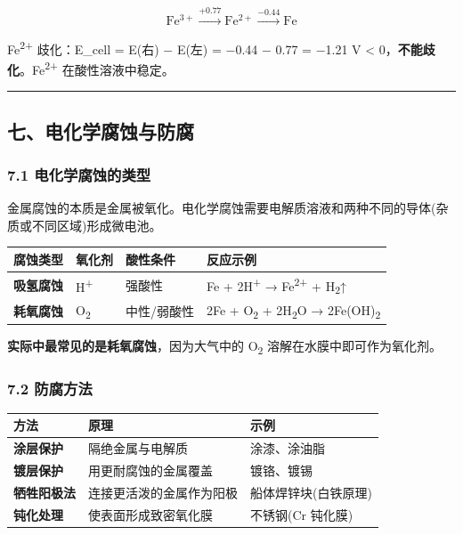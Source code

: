 \documentclass[a4paper,11pt]{ctexart}
\newcounter{none}
\begin{document}
\[\mathrm{Fe^{3+}} \xrightarrow{+0.77} \mathrm{Fe^{2+}} \xrightarrow{-0.44} \mathrm{Fe}\]

Fe\textsuperscript{2+} 歧化：E\_cell = E(右) − E(左) = −0.44 − 0.77 = −1.21 V \textless{} 0，\textbf{不能歧化}。Fe\textsuperscript{2+} 在酸性溶液中稳定。

\begin{center}\rule{0.5\linewidth}{0.5pt}\end{center}

\subsection{七、电化学腐蚀与防腐}\label{ux4e03ux7535ux5316ux5b66ux8150ux8680ux4e0eux9632ux8150}

\subsubsection{7.1 电化学腐蚀的类型}\label{ux7535ux5316ux5b66ux8150ux8680ux7684ux7c7bux578b}

金属腐蚀的本质是金属被氧化。电化学腐蚀需要电解质溶液和两种不同的导体(杂质或不同区域)形成微电池。

{\def\LTcaptype{none} %
\begin{longtable}[]{@{}llll@{}}
\toprule\noalign{}
腐蚀类型 & 氧化剂 & 酸性条件 & 反应示例 \\
\midrule\noalign{}
\endhead
\bottomrule\noalign{}
\endlastfoot
\textbf{吸氢腐蚀} & H\textsuperscript{+} & 强酸性 & Fe + 2H\textsuperscript{+} → Fe\textsuperscript{2+} + H\textsubscript{2}↑ \\
\textbf{耗氧腐蚀} & O\textsubscript{2} & 中性/弱酸性 & 2Fe + O\textsubscript{2} + 2H\textsubscript{2}O → 2Fe(OH)\textsubscript{2} \\
\end{longtable}
}

\textbf{实际中最常见的是耗氧腐蚀}，因为大气中的 O\textsubscript{2} 溶解在水膜中即可作为氧化剂。

\subsubsection{7.2 防腐方法}\label{ux9632ux8150ux65b9ux6cd5}

{\def\LTcaptype{none} %
\begin{longtable}[]{@{}lll@{}}
\toprule\noalign{}
方法 & 原理 & 示例 \\
\midrule\noalign{}
\endhead
\bottomrule\noalign{}
\endlastfoot
\textbf{涂层保护} & 隔绝金属与电解质 & 涂漆、涂油脂 \\
\textbf{镀层保护} & 用更耐腐蚀的金属覆盖 & 镀铬、镀锡 \\
\textbf{牺牲阳极法} & 连接更活泼的金属作为阳极 & 船体焊锌块(白铁原理) \\
\textbf{钝化处理} & 使表面形成致密氧化膜 & 不锈钢(Cr 钝化膜) \\
\end{longtable}
}
\end{document}
